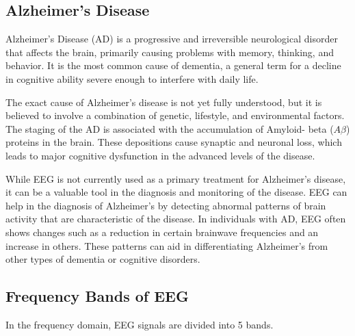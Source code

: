 \documentclass[12pt]{article}
\begin{document}
\subsection{Alzheimer's Disease}
Alzheimer's Disease (AD) is a progressive and irreversible neurological disorder that affects the brain, primarily causing problems with memory, thinking, and behavior. It is the most common cause of dementia, a general term for a decline in cognitive ability severe enough to interfere with daily life. \par
The exact cause of Alzheimer's disease is not yet fully understood, but it is believed to involve a combination of genetic, lifestyle, and environmental factors. The staging of the AD is associated with the accumulation of Amyloid- beta ($A\beta$) proteins in the brain. These depositions cause synaptic and neuronal loss, which leads to major cognitive dysfunction in the advanced levels of the disease.\par

While EEG is not currently used as a primary treatment for Alzheimer's disease, it can be a valuable tool in the diagnosis and monitoring of the disease. EEG can help in the diagnosis of Alzheimer's by detecting abnormal patterns of brain activity that are characteristic of the disease. In individuals with AD, EEG often shows changes such as a reduction in certain brainwave frequencies and an increase in others. These patterns can aid in differentiating Alzheimer's from other types of dementia or cognitive disorders.

\subsection{Frequency Bands of EEG}
In the frequency domain, EEG signals are divided into 5 bands.\cite{freq-bands}
\end{document}
